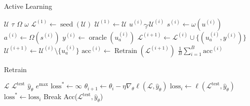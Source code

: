 \documentclass[]{article}
\begin{document}
\begin{minipage}{0.59\linewidth}
	\begin{algorithm}[H]
		\caption{Active Learning}\label{alg:active_learning}
		\begin{algorithmic}[1]
			\Require $\mathcal{U}$ 
			\Require $\tau$ 
			\Require $\Omega$ 
			\Require $\omega$ 
			\State $\mathcal{L}^{(1)} \gets \operatorname{seed}(\mathcal{U})$  
			\State $\mathcal{U}^{(1)} \gets \mathcal{U}$
			\State $u^{(i)} \underset{\tau}{\sim} \mathcal{U}^{(i)}$
			\State $s^{(i)} \gets \omega(u^{(i)})$
			\State $a^{(i)} \gets \Omega(s^{(i)})$ 
			\State $y^{(i)} \gets \operatorname{oracle}(u^{(i)}_{a})$ 
			\State $\mathcal{L}^{(i+1)} \gets \mathcal{L}^{(i)} \cup \{(u^{(i)}_a, y^{(i)})\}$
			\State $\mathcal{U}^{(i+1)} \gets \mathcal{U}^{(i)} \setminus \{u^{(i)}_a\}$
			\State $\text{acc}^{(i)} \gets \operatorname{Retrain}(\mathcal{L}^{(i+1)})$  
			\EndFor
			\State
			\Return $\frac{1}{B} \sum_{i=1}^{B} \text{acc}^{(i)}$
		\end{algorithmic}
	\end{algorithm}
\end{minipage}
\hspace{3mm}
\begin{minipage}{0.35\linewidth}
	\begin{algorithm}[H]
		\caption{Retrain}\label{alg:retrain}
		\begin{algorithmic}[1]
			\Require $\mathcal{L}$ 
			\Require $\mathcal{L}^\text{test}$ 
			\Require $\hat y_\theta$ 
			\Require $e^\text{max}$ 
			\State $\text{loss}^* \gets \infty$
			\State $\theta_{i+1} \gets \theta_i - \eta \nabla_\theta \ell(\mathcal{L}, \hat y_{\theta})$
			\State $\text{loss}_i \gets \ell(\mathcal{L}^\text{test}, \hat y_{\theta})$
			\State $\text{loss}^* \gets \text{loss}_i$
			\Else
			\State Break
			\EndIf
			\EndFor
			\State
			\Return Acc($\mathcal{L}^\text{test}, \hat y_{\theta}$)
		\end{algorithmic}
	\end{algorithm}
\end{minipage}
\end{document}
